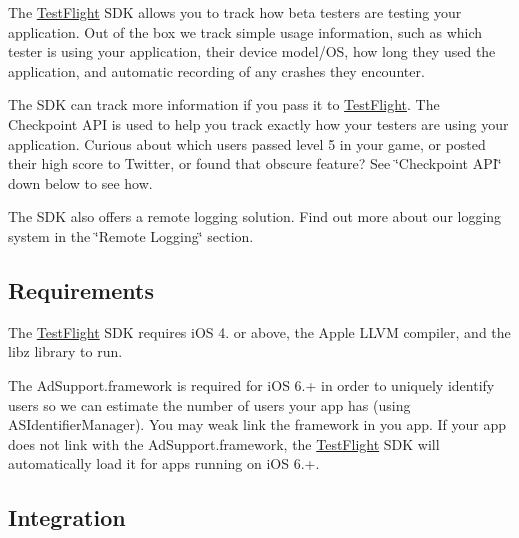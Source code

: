 The \hyperlink{interface_test_flight}{Test\-Flight} S\-D\-K allows you to track how beta testers are testing your application. Out of the box we track simple usage information, such as which tester is using your application, their device model/\-O\-S, how long they used the application, and automatic recording of any crashes they encounter.

The S\-D\-K can track more information if you pass it to \hyperlink{interface_test_flight}{Test\-Flight}. The Checkpoint A\-P\-I is used to help you track exactly how your testers are using your application. Curious about which users passed level 5 in your game, or posted their high score to Twitter, or found that obscure feature? See \char`\"{}\-Checkpoint A\-P\-I\char`\"{} down below to see how.

The S\-D\-K also offers a remote logging solution. Find out more about our logging system in the \char`\"{}\-Remote Logging\char`\"{} section.

\subsection*{Requirements}

The \hyperlink{interface_test_flight}{Test\-Flight} S\-D\-K requires i\-O\-S 4. or above, the Apple L\-L\-V\-M compiler, and the libz library to run.

The Ad\-Support.\-framework is required for i\-O\-S 6.+ in order to uniquely identify users so we can estimate the number of users your app has (using {\ttfamily A\-S\-Identifier\-Manager}). You may weak link the framework in you app. If your app does not link with the Ad\-Support.\-framework, the \hyperlink{interface_test_flight}{Test\-Flight} S\-D\-K will automatically load it for apps running on i\-O\-S 6.+.

\subsection*{Integration}


